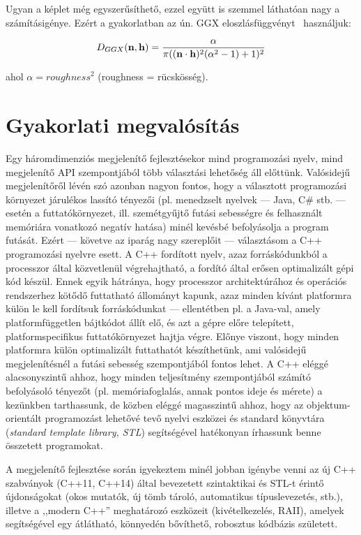 Ugyan a képlet még egyszerűsíthető, ezzel együtt is szemmel láthatóan nagy a számításigénye. Ezért a gyakorlatban az ún. GGX eloszlásfüggvényt~\cite{walter2007microfacet} használjuk:

\[
D_{GGX}(\mathbf{n}, \mathbf{h}) = { \alpha \over { \pi ((\mathbf{n} \cdot \mathbf{h})^2 (\alpha^2 - 1) + 1)^2 } }
\]

ahol \(\alpha = {roughness}^2\) (roughness = rücskösség).

\section{Gyakorlati megvalósítás}

Egy háromdimenziós megjelenítő fejlesztésekor mind programozási nyelv, mind megjelenítő API szempontjából több választási lehetőség áll előttünk. Valósidejű megjelenítőről lévén szó azonban nagyon fontos, hogy a választott programozási környezet járulékos lassító tényezői (pl. menedzselt nyelvek --- Java, C\# stb. --- esetén a futtatókörnyezet, ill. szemétgyűjtő futási sebességre és felhasznált memóriára vonatkozó negatív hatása) minél kevésbé befolyásolja a program futását. Ezért --- követve az iparág nagy szereplőit --- választásom a C++ programozási nyelvre esett. A C++ fordított nyelv, azaz forráskódunkból a processzor által közvetlenül végrehajtható, a fordító által erősen optimalizált gépi kód készül. Ennek egyik hátránya, hogy processzor architektúrához és operációs rendszerhez kötődő futtatható állományt kapunk, azaz minden kívánt platformra külön le kell fordítsuk forráskódunkat --- ellentétben pl. a Java-val, amely platformfüggetlen bájtkódot állít elő, és azt a gépre előre telepített, platformspecifikus futtatókörnyezet hajtja végre. Előnye viszont, hogy minden platformra külön optimalizált futtathatót készíthetünk, ami valósidejű megjelenítésnél a futási sebesség szempontjából fontos lehet. A C++ eléggé alacsonyszintű ahhoz, hogy minden teljesítmény szempontjából számító befolyásoló tényezőt (pl. memóriafoglalás, annak pontos ideje és mérete) a kezünkben tarthassunk, de közben eléggé magasszintű ahhoz, hogy az objektum-orientált programozást lehetővé tevő nyelvi eszközei és standard könyvtára (\textit{standard template library, STL}) segítségével hatékonyan írhassunk benne összetett programokat.

A megjelenítő fejlesztése során igyekeztem minél jobban igénybe venni az új C++ szabványok (C++11, C++14) által bevezetett szintaktikai és STL-t érintő újdonságokat (okos mutatók, új tömb tároló, automatikus típuslevezetés, stb.), illetve a ,,modern C++'' meghatározó eszközeit (kivételkezelés, RAII), amelyek segítségével egy átlátható, könnyedén bővíthető, robosztus kódbázis született.

